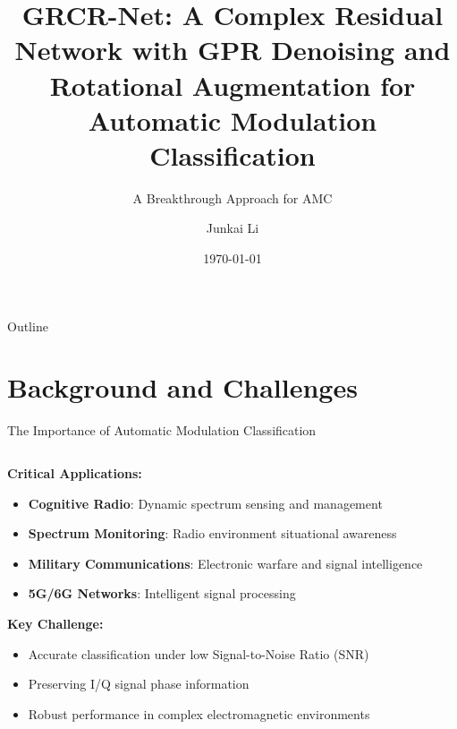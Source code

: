 \documentclass[aspectratio=169]{beamer}
\title[GRCR-Net]{GRCR-Net: A Complex Residual Network with GPR Denoising and Rotational Augmentation for Automatic Modulation Classification}
\subtitle{A Breakthrough Approach for AMC}
\author[Junkai Li]{Junkai Li}
\institute[ZJUT]{College of Information Engineering\\Zhejiang University of Technology}
\date{\today}
\begin{document}
\begin{frame}
    \titlepage
\end{frame}

\begin{frame}{Outline}
\tableofcontents
\end{frame}

\section{Background and Challenges}

\begin{frame}{The Importance of Automatic Modulation Classification}
\begin{columns}
\begin{column}{0.6\textwidth}
\textbf{Critical Applications:}
\begin{itemize}
\item \textbf{Cognitive Radio}: Dynamic spectrum sensing and management
\item \textbf{Spectrum Monitoring}: Radio environment situational awareness
\item \textbf{Military Communications}: Electronic warfare and signal intelligence
\item \textbf{5G/6G Networks}: Intelligent signal processing
\end{itemize}

\vspace{0.5cm}
\textbf{Key Challenge:}
\begin{itemize}
\item Accurate classification under low Signal-to-Noise Ratio (SNR)
\item Preserving I/Q signal phase information
\item Robust performance in complex electromagnetic environments
\end{itemize}
\end{column}
\begin{column}{0.4\textwidth}
\end{column}
\end{columns}
\end{frame}
\end{document}
